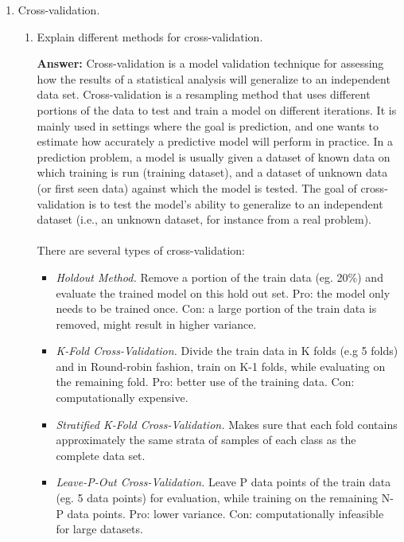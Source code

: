 \documentclass{article}
\newenvironment{QandA}{\begin{enumerate}[label=\arabic*.]}{\end{enumerate}}
\newenvironment{InnerQandA}{\begin{enumerate}[label=\roman*.]}{\end{enumerate}}
\newenvironment{answer}{\par\normalfont \textbf{Answer:}}{}
\begin{document}
\begin{QandA}
    \item Cross-validation.
    \begin{InnerQandA}
        \item Explain different methods for cross-validation.
        \begin{answer}
            Cross-validation is a model validation technique for assessing how the results of a statistical analysis will generalize to an independent data set. Cross-validation is a resampling method that uses different portions of the data to test and train a model on different iterations. It is mainly used in settings where the goal is prediction, and one wants to estimate how accurately a predictive model will perform in practice. In a prediction problem, a model is usually given a dataset of known data on which training is run (training dataset), and a dataset of unknown data (or first seen data) against which the model is tested. The goal of cross-validation is to test the model's ability to generalize to an independent dataset (i.e., an unknown dataset, for instance from a real problem).\\\\
            There are several types of cross-validation:
            \begin{itemize}
                \item \textit{Holdout Method.} Remove a portion of the train data (eg. 20\%) and evaluate the trained model on this hold out set. Pro: the model only needs to be trained once. Con: a large portion of the train data is removed, might result in higher variance.

                \item \textit{K-Fold Cross-Validation.} Divide the train data in K folds (e.g 5 folds) and in Round-robin fashion, train on K-1 folds, while evaluating on the remaining fold. Pro: better use of the training data. Con: computationally expensive. 

                \item \textit{Stratified K-Fold Cross-Validation.} Makes sure that each fold contains approximately the same strata of samples of each class as the complete data set.

                \item \textit{Leave-P-Out Cross-Validation. } Leave P data points of the train data (eg. 5 data points) for evaluation, while training on the remaining N-P data points. Pro: lower variance. Con: computationally infeasible for large datasets.
            \end{itemize}


\end{answer}
\end{InnerQandA}
\end{QandA}
\end{document}
